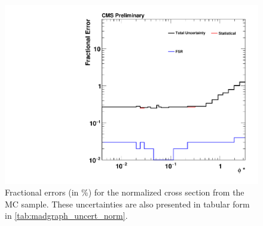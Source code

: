 \begin{figure}[!p]
    \centering
    \includegraphics[width=\textwidth]{figures/madgraph_uncertainty_normalized.pdf}
    \caption[
        Fractional errors (in \%) for the normalized cross section from the
        \MADGRAPH MC sample.
    ]{
        Fractional errors (in \%) for the normalized cross section from the
        \MADGRAPH MC sample. These uncertainties are also presented in tabular
        form in \cref{tab:madgraph_uncert_norm}.
    }
    \label{fig:madgraph_uncert_norm}
\end{figure}
